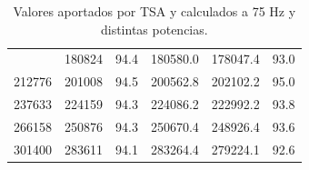 \documentclass[12pt]{article}
\begin{document}
{\begin{table}[H]
\begin{tabular}{cccccc}
{191525 & 180824 & 94.4    & 180580.0                    & 178047.4                   & 93.0                 \\
212776 & 201008 & 94.5    & 200562.8                    & 202102.2                   & 95.0                 \\
237633 & 224159 & 94.3    & 224086.2                    & 222992.2                   & 93.8                 \\
266158 & 250876 & 94.3    & 250670.4                    & 248926.4                   & 93.6                 \\
301400 & 283611 & 94.1    & 283264.4                    & 279224.1                   & 92.6                 \\ \hline
        \end{tabular}
        \caption{Valores aportados por TSA y calculados a 75 Hz y distintas potencias.}
        \label{tab:valores_finales}
        \end{table}
}
\end{document}
